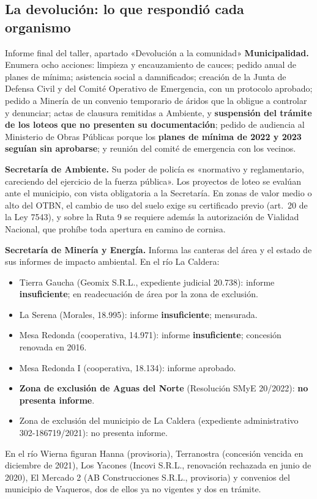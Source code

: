 \subsection*{La devolución: lo que respondió cada organismo}

\begin{ficha}{Informe final del taller, apartado «Devolución a la comunidad»}
\textbf{Municipalidad.} Enumera ocho acciones: limpieza y encauzamiento de cauces; pedido anual de planes de mínima; asistencia social a damnificados; creación de la Junta de Defensa Civil y del Comité Operativo de Emergencia, con un protocolo aprobado; pedido a Minería de un convenio temporario de áridos que la obligue a controlar y denunciar; actas de clausura remitidas a Ambiente, y \textbf{suspensión del trámite de los loteos que no presenten su documentación}; pedido de audiencia al Ministerio de Obras Públicas porque los \textbf{planes de mínima de 2022 y 2023 seguían sin aprobarse}; y reunión del comité de emergencia con los vecinos.

\textbf{Secretaría de Ambiente.} Su poder de policía es «normativo y reglamentario, careciendo del ejercicio de la fuerza pública». Los proyectos de loteo se evalúan ante el municipio, con vista obligatoria a la Secretaría. En zonas de valor medio o alto del OTBN, el cambio de uso del suelo exige su certificado previo (art.\ 20 de la Ley 7543), y sobre la Ruta 9 se requiere además la autorización de Vialidad Nacional, que prohíbe toda apertura en camino de cornisa.

\textbf{Secretaría de Minería y Energía.} Informa las canteras del área y el estado de sus informes de impacto ambiental. En el río La Caldera:
\begin{itemize}[leftmargin=*,nosep]
\item Tierra Gaucha (Geomix S.R.L., expediente judicial 20.738): informe \textbf{insuficiente}; en readecuación de área por la zona de exclusión.
\item La Serena (Morales, 18.995): informe \textbf{insuficiente}; mensurada.
\item Mesa Redonda (cooperativa, 14.971): informe \textbf{insuficiente}; concesión renovada en 2016.
\item Mesa Redonda I (cooperativa, 18.134): informe aprobado.
\item \textbf{Zona de exclusión de Aguas del Norte} (Resolución SMyE 20/2022): \textbf{no presenta informe}.
\item Zona de exclusión del municipio de La Caldera (expediente administrativo 302-186719/2021): no presenta informe.
\end{itemize}
En el río Wierna figuran Hanna (provisoria), Terranostra (concesión vencida en diciembre de 2021), Los Yacones (Incovi S.R.L., renovación rechazada en junio de 2020), El Mercado 2 (AB Construcciones S.R.L., provisoria) y convenios del municipio de Vaqueros, dos de ellos ya no vigentes y dos en trámite.


\end{ficha}
